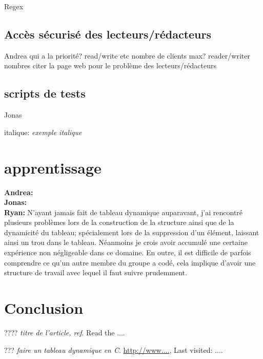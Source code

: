 \documentclass[11pt,a4paper]{article}
\begin{document}
Regex\\

\subsection{Accès sécurisé des lecteurs/rédacteurs}
Andrea
qui a la priorité? read/write etc
nombre de clients max? reader/writer nombres
citer la page web pour le problème des lecteurs/rédacteurs
\subsection{scripts de tests}
Jonas

italique: \textit{exemple italique}

\section{apprentissage}
\textbf{Andrea:}\\

\textbf{Jonas:}\\

\textbf{Ryan:} N'ayant jamais fait de tableau dynamique auparavant, j'ai rencontré plusieurs problèmes lors de la construction de la structure ainsi que de la dynamicité du tableau; spécialement lors de la suppression d'un élément, laissant ainsi un trou dans le tableau. Néanmoins je crois avoir accumulé une certaine expérience non négligeable dans ce domaine. En outre, il est difficile de parfois comprendre ce qu'un autre membre du groupe a codé, cela implique d'avoir une structure de travail avec lequel il faut suivre prudemment.  

\section{Conclusion}



\begin{thebibliography}{20}

????			%
\textit{titre de l'article, ref}.	%
Read the ....										%

???			%
\textit{faire un tableau dynamique en C}.					    %
\url{http://www....},	%
Last visited: ....								%
\end{thebibliography}
\end{document}
